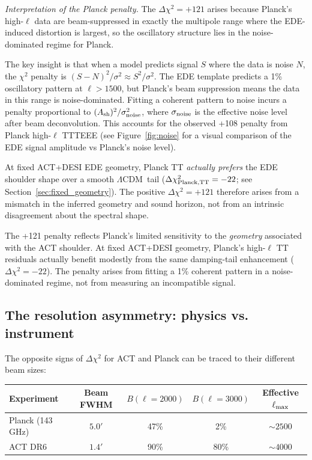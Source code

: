 \documentclass[onecolumn,showpacs,preprintnumbers,amsmath,amssymb,prd]{revtex4-2}
\newcommand{\lcdm}{$\Lambda$CDM}
\begin{document}
\emph{Interpretation of the Planck penalty.} The $\Delta\chi^2 = +121$ 
arises because Planck's high-$\ell$ data are beam-suppressed in exactly the 
multipole range where the EDE-induced distortion is largest, so the oscillatory 
structure lies in the noise-dominated regime for Planck.

The key insight is that when a model predicts signal $S$ where the data 
is noise $N$, the $\chi^2$ penalty is $(S-N)^2/\sigma^2 \approx S^2/\sigma^2$. 
The EDE template predicts a 1\% oscillatory pattern at $\ell > 1500$, but 
Planck's beam suppression means the data in this range is noise-dominated. 
Fitting a coherent pattern to noise incurs a penalty proportional to 
$(A_{\rm sh})^2/\sigma_{\rm noise}^2$, where $\sigma_{\rm noise}$ is the 
effective noise level after beam deconvolution. This accounts for the 
observed +108 penalty from Planck high-$\ell$ TTTEEE (see 
Figure~\ref{fig:noise} for a visual comparison of the EDE signal amplitude 
vs Planck's noise level).

At fixed ACT+DESI EDE geometry, Planck TT \emph{actually prefers} the 
EDE shoulder shape over a smooth \lcdm\ tail ($\Delta\chi^2_{\rm Planck,TT} = -22$; 
see Section~\ref{sec:fixed_geometry}). The positive $\Delta\chi^2 = +121$ 
therefore arises from a mismatch in the inferred geometry and sound horizon, 
not from an intrinsic disagreement about the spectral shape.

The +121 penalty reflects Planck's limited sensitivity to the \emph{geometry} 
associated with the ACT shoulder. At fixed ACT+DESI geometry, Planck's high-$\ell$ 
TT residuals actually benefit modestly from the same damping-tail enhancement 
($\Delta\chi^2 = -22$). The penalty arises from fitting a 1\% coherent pattern 
in a noise-dominated regime, not from measuring an incompatible signal.

\subsection{The resolution asymmetry: physics vs. instrument}

The opposite signs of $\Delta\chi^2$ for ACT and Planck can be traced to their 
different beam sizes:
\begin{center}
\begin{tabular}{lcccc}
\toprule
Experiment & Beam FWHM & $B(\ell=2000)$ & $B(\ell=3000)$ & Effective $\ell_{\rm max}$ \\
\midrule
Planck (143 GHz) & $5.0'$ & 47\% & 2\% & $\sim 2500$ \\
ACT DR6 & $1.4'$ & 90\% & 80\% & $\sim 4000$ \\
\bottomrule
\end{tabular}
\end{center}
\end{document}
